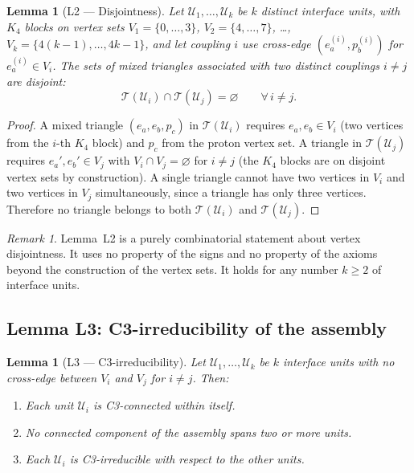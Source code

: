 \documentclass[11pt,a4paper]{article}
\newtheorem{lemma}[theorem]{Lemma}
\theoremstyle{definition}
\theoremstyle{remark}
\newtheorem{remark}[theorem]{Remark}
\newcommand{\Kfour}{K_4}
\begin{document}
\begin{lemma}[L2 --- Disjointness]
\label{lem:L2}
Let $\mathcal{U}_1, \ldots, \mathcal{U}_k$ be $k$ distinct interface units, with $\Kfour$ blocks on vertex sets $V_1 = \{0,\ldots,3\}$, $V_2 = \{4,\ldots,7\}$, \ldots, $V_k = \{4(k-1),\ldots,4k-1\}$, and let coupling $i$ use cross-edge $(e_a^{(i)}, p_b^{(i)})$ for $e_a^{(i)} \in V_i$. The sets of mixed triangles associated with two distinct couplings $i \neq j$ are disjoint:
\begin{equation}
  \mathcal{T}(\mathcal{U}_i) \cap \mathcal{T}(\mathcal{U}_j) = \varnothing \qquad \forall\, i \neq j.
  \label{eq:disjoint}
\end{equation}
\end{lemma}

\begin{proof}
A mixed triangle $(e_a, e_b, p_c)$ in $\mathcal{T}(\mathcal{U}_i)$ requires $e_a, e_b \in V_i$ (two vertices from the $i$-th $\Kfour$ block) and $p_c$ from the proton vertex set. A triangle in $\mathcal{T}(\mathcal{U}_j)$ requires $e_a', e_b' \in V_j$ with $V_i \cap V_j = \varnothing$ for $i \neq j$ (the $\Kfour$ blocks are on disjoint vertex sets by construction). A single triangle cannot have two vertices in $V_i$ and two vertices in $V_j$ simultaneously, since a triangle has only three vertices. Therefore no triangle belongs to both $\mathcal{T}(\mathcal{U}_i)$ and $\mathcal{T}(\mathcal{U}_j)$.
\end{proof}

\begin{remark}
Lemma~L2 is a purely combinatorial statement about vertex disjointness. It uses no property of the signs and no property of the axioms beyond the construction of the vertex sets. It holds for any number $k \geq 2$ of interface units.
\end{remark}

\subsection{Lemma L3: C3-irreducibility of the assembly}

\begin{lemma}[L3 --- C3-irreducibility]
\label{lem:L3}
Let $\mathcal{U}_1, \ldots, \mathcal{U}_k$ be $k$ interface units with no cross-edge between $V_i$ and $V_j$ for $i \neq j$. Then:
\begin{enumerate}[label=(\alph*)]
  \item Each unit $\mathcal{U}_i$ is C3-connected within itself.
  \item No connected component of the assembly spans two or more units.
  \item Each $\mathcal{U}_i$ is C3-irreducible with respect to the other units.
\end{enumerate}
\end{lemma}
\end{document}
